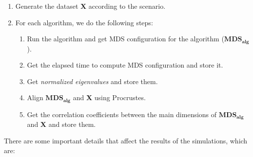 \documentclass[11pt]{report}
\begin{document}
\begin{enumerate}

\item Generate the dataset \textbf{X} according to the scenario. 

\item For each algorithm, we do the following steps:

\begin{enumerate}

\item Run the algorithm and get MDS configuration for the algorithm
($\mathbf{MDS_{alg}}$).

\item Get the elapsed time to compute MDS configuration and store it.

\item Get \textit{normalized eigenvalues} and store them.

\item Align $\mathbf{MDS_{alg}}$ and \textbf{X} using Procrustes.

\item Get the correlation coefficients between the main dimensions of 
$\mathbf{MDS_{alg}}$ and \textbf{X} and store them.

\end{enumerate}

\end{enumerate}

\indent There are some important details that affect the results of the 
simulations, which are:
\end{document}

